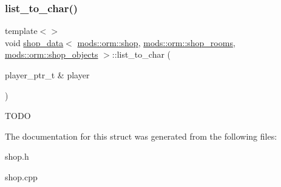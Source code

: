\subsubsection{\texorpdfstring{list\+\_\+to\+\_\+char()}{list\_to\_char()}}
{\footnotesize\ttfamily template$<$$>$ \\
void \hyperlink{structshop__data}{shop\+\_\+data}$<$ \hyperlink{structmods_1_1orm_1_1shop}{mods\+::orm\+::shop}, \hyperlink{structmods_1_1orm_1_1shop__rooms}{mods\+::orm\+::shop\+\_\+rooms}, \hyperlink{structmods_1_1orm_1_1shop__objects}{mods\+::orm\+::shop\+\_\+objects} $>$\+::list\+\_\+to\+\_\+char (\begin{DoxyParamCaption}\item[{player\+\_\+ptr\+\_\+t \&}]{player }\end{DoxyParamCaption})}

T\+O\+DO 

The documentation for this struct was generated from the following files\+:\begin{DoxyCompactItemize}
\item 
shop.\+h\item 
shop.\+cpp\end{DoxyCompactItemize}
